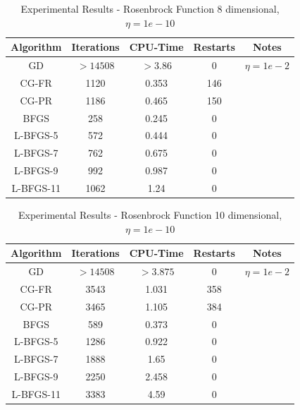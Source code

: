 \documentclass[12pt]{amsart}
\begin{document}
\begin{table}
\caption{Experimental Results - Rosenbrock Function 8 dimensional, $\eta=1e-10$}
\label{results_table}
\begin{center}
\begin{tabular}{|c||c||c||c||c|}
\hline
Algorithm & Iterations & CPU-Time & Restarts & Notes\\
\hline
GD & $>14508$ & $>3.86$& 0  & $\eta=1e-2$ \\
\hline
CG-FR & 1120 & 0.353 & 146 & \\
\hline
CG-PR & 1186 & 0.465 & 150 & \\
\hline
BFGS & 258 & 0.245 & 0 & \\
\hline
L-BFGS-5 & 572 & 0.444 & 0 &\\
\hline
L-BFGS-7 & 762 & 0.675 & 0 &\\
\hline
L-BFGS-9 & 992 & 0.987 & 0 &\\
\hline
L-BFGS-11 & 1062 & 1.24 & 0 &\\
\hline
\end{tabular}
\end{center}
\end{table}

\begin{table}
\caption{Experimental Results - Rosenbrock Function 10 dimensional, $\eta=1e-10$}
\label{results_table}
\begin{center}
\begin{tabular}{|c||c||c||c||c|}
\hline
Algorithm & Iterations & CPU-Time & Restarts & Notes\\
\hline
GD & $>14508$ & $>3.875$ & 0 & $\eta=1e-2$ \\
\hline
CG-FR & 3543 & 1.031 & 358 & \\
\hline
CG-PR & 3465 & 1.105 & 384 & \\
\hline
BFGS & 589 & 0.373 & 0 & \\
\hline
L-BFGS-5 & 1286 & 0.922 & 0 &\\
\hline
L-BFGS-7 & 1888 & 1.65 & 0 &\\
\hline
L-BFGS-9 & 2250 & 2.458 & 0 &\\
\hline
L-BFGS-11 & 3383 & 4.59 & 0 &\\
\hline
\end{tabular}
\end{center}
\end{table}
\end{document}
